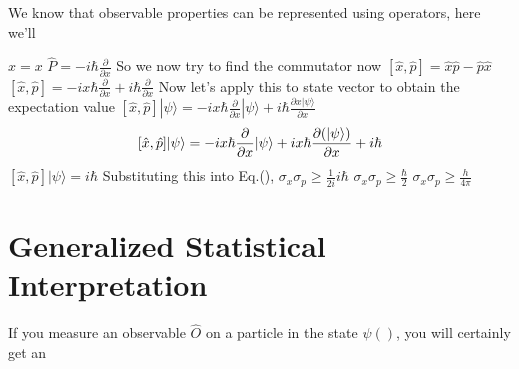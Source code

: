 We know that observable properties can be represented using operators, here we'll 

$\hat{x} = x$
$\hat{P} = -i\hbar \frac{\partial}{\partial x}$
So we now try to find the commutator now
$[\hat{x}, \hat{p}] = \hat{x}\hat{p} - \hat{p}\hat{x}$
$[\hat{x}, \hat{p}] = -ix\hbar \frac{\partial}{\partial x} + i\hbar \frac{\partial}{\partial x}$
Now let's apply this to state vector to obtain the expectation value
$[\hat{x}, \hat{p}] |\psi\rangle = -ix\hbar \frac{\partial}{\partial x} |\psi\rangle + i\hbar \frac{\partial x|\psi\rangle}{\partial x}$
$$[\hat{x}, \hat{p}] |\psi\rangle = -ix\hbar \frac{\partial}{\partial x} |\psi\rangle + ix\hbar \pdv{(|\psi\rangle)}{x} + i\hbar$$
$[\hat{x}, \hat{p}] |\psi\rangle = i\hbar$
Substituting this into Eq.(),
$\sigma_{x}\sigma_{p} \geq \frac{1}{2i} i\hbar$
$\sigma_{x}\sigma_{p} \geq \frac{\hbar}{2}$ 
$\sigma_{x}\sigma_{p} \geq \frac{h}{4 \pi}$
\section{Generalized Statistical Interpretation}
If you measure an observable $\hat{O}$ on a particle in the state $\psi()$, you will certainly get an  